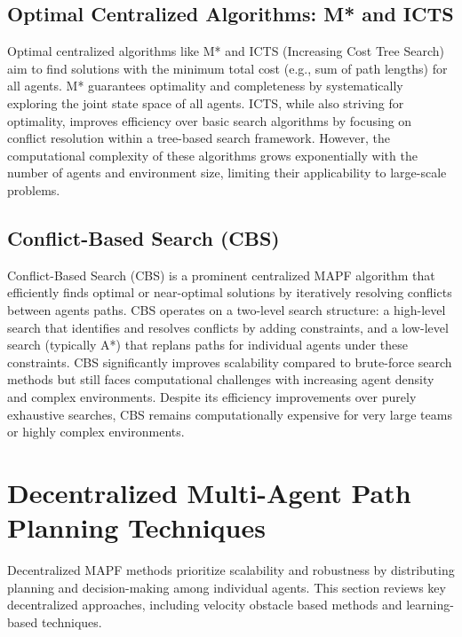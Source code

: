 \subsection{Optimal Centralized Algorithms: M* and ICTS}
Optimal centralized algorithms like M* \cite{Standley2011Complete} %
and ICTS (Increasing Cost Tree Search) aim to find solutions with the minimum total cost (e.g., sum of path lengths) for all agents. M* guarantees optimality and completeness by systematically exploring the joint state space of all agents. ICTS, while also striving for optimality, improves efficiency over basic search algorithms by focusing on conflict resolution within a tree-based search framework. However, the computational complexity of these algorithms grows exponentially with the number of agents and environment size, limiting their applicability to large-scale problems.

\subsection{Conflict-Based Search (CBS)}
Conflict-Based Search (CBS) \cite{Sharon2015CBS} %
is a prominent centralized MAPF algorithm that efficiently finds optimal or near-optimal solutions by iteratively resolving conflicts between agents paths. CBS operates on a two-level search structure: a high-level search that identifies and resolves conflicts by adding constraints, and a low-level search (typically A*) that replans paths for individual agents under these constraints. CBS significantly improves scalability compared to brute-force search methods but still faces computational challenges with increasing agent density and complex environments. Despite its efficiency improvements over purely exhaustive searches, CBS remains computationally expensive for very large teams or highly complex environments.

\section{Decentralized Multi-Agent Path Planning Techniques}
Decentralized MAPF methods prioritize scalability and robustness by distributing planning and decision-making among individual agents. This section reviews key decentralized approaches, including velocity obstacle based methods and learning-based techniques.

